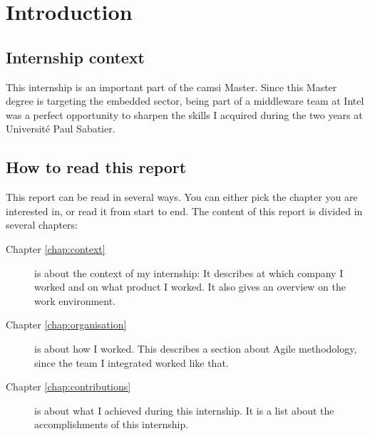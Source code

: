 \chapter{Introduction}

\section{Internship context}
This internship is an important part of the \gls{camsi} Master.
Since this Master degree is targeting the embedded sector, being part of a middleware team at Intel
was a perfect opportunity to sharpen the skills I acquired during the two years at Université Paul Sabatier.

\section{How to read this report}

This report can be read in several ways. You can either pick the chapter you are
interested in, or read it from start to end. The content of this report
is divided in several chapters:

\begin{description}
    \item[Chapter \ref{chap:context}] is about the context of my internship: It describes at which company I worked and on what product I worked.
        It also gives an overview on the work environment.
    \item[Chapter \ref{chap:organisation}] is about how I worked. This describes a section about Agile methodology, since the
        team I integrated worked like that.
    \item[Chapter \ref{chap:contributions}] is about what I achieved during this internship. It is a list about the accomplishments
        of this internship.
\end{description}
